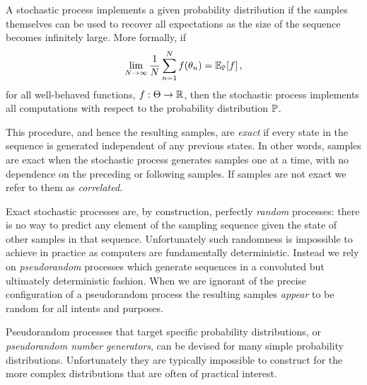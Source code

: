A stochastic process implements a given probability distribution if 
the samples themselves can be used to recover all expectations as 
the size of the sequence becomes infinitely large. More formally, if
%
\begin{equation*}
\lim_{N \rightarrow \infty} \frac{1}{N} 
\sum_{n = 1}^{N} f \! \left( \theta_{n} \right)
= \mathbb{E}_{\mathbb{P}} \! \left[ f \right],
\end{equation*}
%
for all well-behaved functions, $f : \Theta \rightarrow \mathbb{R}$, then the 
stochastic process implements all computations with respect to the 
probability distribution $\mathbb{P}$.

This procedure, and hence the resulting samples, are \emph{exact} 
if every state in the sequence is generated independent of any previous 
states.  In other words, samples are exact when the stochastic process 
generates samples one at a time, with no dependence on the preceding 
or following samples.  If samples are not exact we refer to them as 
\emph{correlated}.

Exact stochastic processes are, by construction, perfectly
\emph{random} processes: there is no way to predict any element 
of the sampling sequence given the state of other samples in
that sequence.  Unfortunately such randomness is impossible to 
achieve in practice as computers are fundamentally deterministic.
Instead we rely on \emph{pseudorandom} processes which
generate sequences in a convoluted but ultimately deterministic
fashion.  When we are ignorant of the precise configuration of a
pseudorandom process the resulting samples \emph{appear} to be
random for all intents and purposes.

Pseudorandom processes that target specific probability distributions, 
or \emph{pseudorandom number generators}, can be devised for 
many simple probability distributions.  Unfortunately they are typically 
impossible to construct for the more complex distributions that are
often of practical interest.